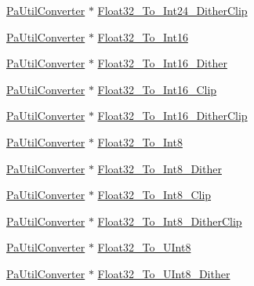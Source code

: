 \begin{DoxyCompactItemize}
\hyperlink{pa__converters_8h_a4f65f7c2e9e185e7f8caebe85ae9575c}{Pa\+Util\+Converter} $\ast$ \hyperlink{struct_pa_util_converter_table_a4fbad41daae148fd43ebd1961d764e31}{Float32\+\_\+\+To\+\_\+\+Int24\+\_\+\+Dither\+Clip}
\item 
\hyperlink{pa__converters_8h_a4f65f7c2e9e185e7f8caebe85ae9575c}{Pa\+Util\+Converter} $\ast$ \hyperlink{struct_pa_util_converter_table_a862bd862c373016ff4cb42362d4188aa}{Float32\+\_\+\+To\+\_\+\+Int16}
\item 
\hyperlink{pa__converters_8h_a4f65f7c2e9e185e7f8caebe85ae9575c}{Pa\+Util\+Converter} $\ast$ \hyperlink{struct_pa_util_converter_table_a6f44a10b6e0fdd6703ddbf222824680b}{Float32\+\_\+\+To\+\_\+\+Int16\+\_\+\+Dither}
\item 
\hyperlink{pa__converters_8h_a4f65f7c2e9e185e7f8caebe85ae9575c}{Pa\+Util\+Converter} $\ast$ \hyperlink{struct_pa_util_converter_table_a224dbdb27b7c497a43be0ac3628f4313}{Float32\+\_\+\+To\+\_\+\+Int16\+\_\+\+Clip}
\item 
\hyperlink{pa__converters_8h_a4f65f7c2e9e185e7f8caebe85ae9575c}{Pa\+Util\+Converter} $\ast$ \hyperlink{struct_pa_util_converter_table_aff1328d2334cef2836d4ff6dc7f5077d}{Float32\+\_\+\+To\+\_\+\+Int16\+\_\+\+Dither\+Clip}
\item 
\hyperlink{pa__converters_8h_a4f65f7c2e9e185e7f8caebe85ae9575c}{Pa\+Util\+Converter} $\ast$ \hyperlink{struct_pa_util_converter_table_a0daeb8fb3c880f6c08b3182e5b1604a4}{Float32\+\_\+\+To\+\_\+\+Int8}
\item 
\hyperlink{pa__converters_8h_a4f65f7c2e9e185e7f8caebe85ae9575c}{Pa\+Util\+Converter} $\ast$ \hyperlink{struct_pa_util_converter_table_a206dcfac5181a45ef22c3f88411989e5}{Float32\+\_\+\+To\+\_\+\+Int8\+\_\+\+Dither}
\item 
\hyperlink{pa__converters_8h_a4f65f7c2e9e185e7f8caebe85ae9575c}{Pa\+Util\+Converter} $\ast$ \hyperlink{struct_pa_util_converter_table_a2d1a63569dd768d4d482ce29c86b8792}{Float32\+\_\+\+To\+\_\+\+Int8\+\_\+\+Clip}
\item 
\hyperlink{pa__converters_8h_a4f65f7c2e9e185e7f8caebe85ae9575c}{Pa\+Util\+Converter} $\ast$ \hyperlink{struct_pa_util_converter_table_aac911fb6884627bc329a8c8cb74a7f23}{Float32\+\_\+\+To\+\_\+\+Int8\+\_\+\+Dither\+Clip}
\item 
\hyperlink{pa__converters_8h_a4f65f7c2e9e185e7f8caebe85ae9575c}{Pa\+Util\+Converter} $\ast$ \hyperlink{struct_pa_util_converter_table_a16cb19ba65abf6fb4cca324e3836b937}{Float32\+\_\+\+To\+\_\+\+U\+Int8}
\item 
\hyperlink{pa__converters_8h_a4f65f7c2e9e185e7f8caebe85ae9575c}{Pa\+Util\+Converter} $\ast$ \hyperlink{struct_pa_util_converter_table_a30c83c4ce7f1a546a8179c505dca8ae6}{Float32\+\_\+\+To\+\_\+\+U\+Int8\+\_\+\+Dither}

\end{DoxyCompactItemize}
